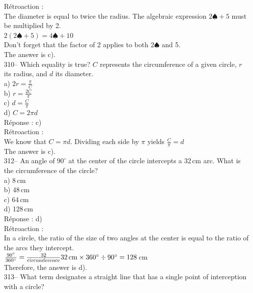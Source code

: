 \documentclass[letterpaper, 12pt]{article}
\begin{document}
R\'etroaction :\\
The diameter is equal to twice the radius. The algebraic expression $2\spadesuit+5$ must be multiplied by 2.\\
$2\left(2\spadesuit+5\right) =4\spadesuit+10$\\
Don't forget that the factor of 2 applies to both $2\spadesuit$ and 5.\\
The answer is c).\\

310-- Which equality is true? $C$ represents the circumference of a given circle, $r$ its radius, and $d$ its diameter.\\

a) $2r=\frac{\pi}{C}$\\[2mm]
b) $r=\frac{2C}{\pi}$\\[2mm]
c) $d=\frac{C}{\pi}$\\[2mm]
d) $C=2\pi d$\\

R\'eponse : c)\\

R\'etroaction :\\
We know that $C=\pi d$. Dividing each side by $\pi$ yields $\frac{C}{\pi}=d$\\
The answer is c).\\


312-- An angle of $90^{\circ}$ at the center of the circle intercepts a 32\,cm arc. What is the circumference of the circle?\\

a) 8\,cm\\
b) 48\,cm\\
c) 64\,cm\\
d) 128\,cm\\

R\'eponse : d)\\

R\'etroaction :\\
In a circle, the ratio of the size of two angles at the center is equal to the ratio of the arcs they intercept.\\[2mm]
$\frac{90^{\circ}}{360^{\circ}}=\frac{32}{\textrm{circumference}}\\[2mm]
32\textrm{\,cm}\times360^{\circ}\div90^{\circ}=128$\,cm\\[2mm]
Therefore, the answer is d).\\

313-- What term designates a straight line that has a single point of interception with a circle?\\
\end{document}
